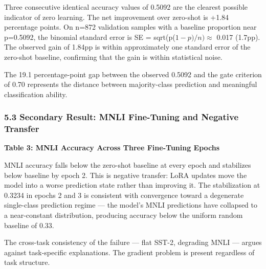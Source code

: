 Three consecutive identical accuracy values of 0.5092 are the clearest possible indicator of zero learning. The net improvement over zero-shot is +1.84 percentage points. On n=872 validation samples with a baseline proportion near p=0.5092, the binomial standard error is SE = sqrt(p($1-p)/n) \approx$ 0.017 (1.7pp). The observed gain of 1.84pp is within approximately one standard error of the zero-shot baseline, confirming that the gain is within statistical noise.

The 19.1 percentage-point gap between the observed 0.5092 and the gate criterion of 0.70 represents the distance between majority-class prediction and meaningful classification ability.

\subsubsection{5.3 Secondary Result: MNLI Fine-Tuning and Negative Transfer}

\textbf{Table 3: MNLI Accuracy Across Three Fine-Tuning Epochs}

\begin{table}[htbp]
\centering
{}
\end{table}

MNLI accuracy falls below the zero-shot baseline at every epoch and stabilizes below baseline by epoch 2. This is negative transfer: LoRA updates move the model into a worse prediction state rather than improving it. The stabilization at 0.3234 in epochs 2 and 3 is consistent with convergence toward a degenerate single-class prediction regime --- the model's MNLI predictions have collapsed to a near-constant distribution, producing accuracy below the uniform random baseline of 0.33.

The cross-task consistency of the failure --- flat SST-2, degrading MNLI --- argues against task-specific explanations. The gradient problem is present regardless of task structure.

